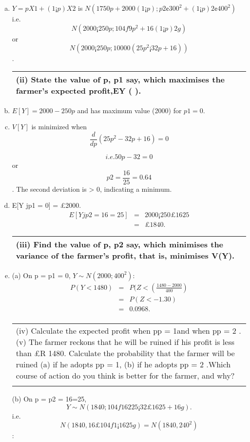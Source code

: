 \documentclass[a4paper,12pt]{article}
\begin{document}
\begin{enumerate}[(a)]
\item $Y = pX1 + (1 ¡ p)X2$ is $N(1750p + 2000(1 ¡ p); p2 ¢ 300^2 + (1 ¡ p)2 ¢ 400^2)$
i.e. \[N(2000 ¡ 250p; 104f9p^2 + 16(1 ¡ p)2g)\]
or \[N(2000 ¡ 250p; 10000(25p^2 ¡ 32p + 16))\].

  \begin{table}[ht!]
     \centering
     \begin{tabular}{|p{15cm}|}
     \hline  
(ii) State the value of p, p1 say, which maximises the farmer’s expected profit,EY ( ). 
\\ \hline 
      \end{tabular}
    \end{table}
    
    
\item $E[Y ] = 2000 - 250p$ and has maximum value (2000) for $p1 = 0$.
\item $V[Y]$ is minimized when 
\[ \frac{d}{dp}(25p^2 - 32p + 16) =0\]

\[i.e. 50p - 32 = 0\] or \[p2 = \frac{16}{25}=0.64\].
The second deviation is > 0, indicating a minimum.
\item  E[Y jp1 = 0] = £2000. 
\begin{eqnarray*}
E[Y jp2 = 16=25] &=& 2000 ¡ 250£16
25\\ &=& £1840.
\end{eqnarray*}

  \begin{table}[ht!]
     \centering
     \begin{tabular}{|p{15cm}|}
     \hline  

(iii) Find the value of  p, p2  say, which minimises the variance of the farmer’s profit, that is, minimises V(Y). \\ \hline 
      \end{tabular}
    \end{table}
\item  (a) On p = p1 = 0, $Y \sim N(2000; 400^2)$:
\begin{eqnarray*}
P(Y < 1480) &=& P(Z < \left( \frac{1480-2000}{400}
\right) \\
&=& P(Z < -1.30)\\ 
&=& 0.0968.\\
\end{eqnarray*}

  \begin{table}[ht!]
     \centering
     \begin{tabular}{|p{15cm}|}
     \hline  
(iv) Calculate the expected profit when pp = 1and when pp = 2 .
(v) The farmer reckons that he will be ruined if his profit is less than £R 1480. Calculate the probability that the farmer will be ruined (a) if he adopts pp = 1, (b) if he adopts pp = 2 .Which course of action do you think is better for the farmer, and why?\\\\ \hline
      \end{tabular}
    \end{table}
(b) On p = p2 = 16=25, 
\[Y \sim N(1840; 104f162
25 ¡ 32£16
25 + 16g).\]
i.e. \[N(1840, 16 £ 104f1 ¡ 16
25g) = N(1840, 240^2)\]:



\end{enumerate}
\end{document}
